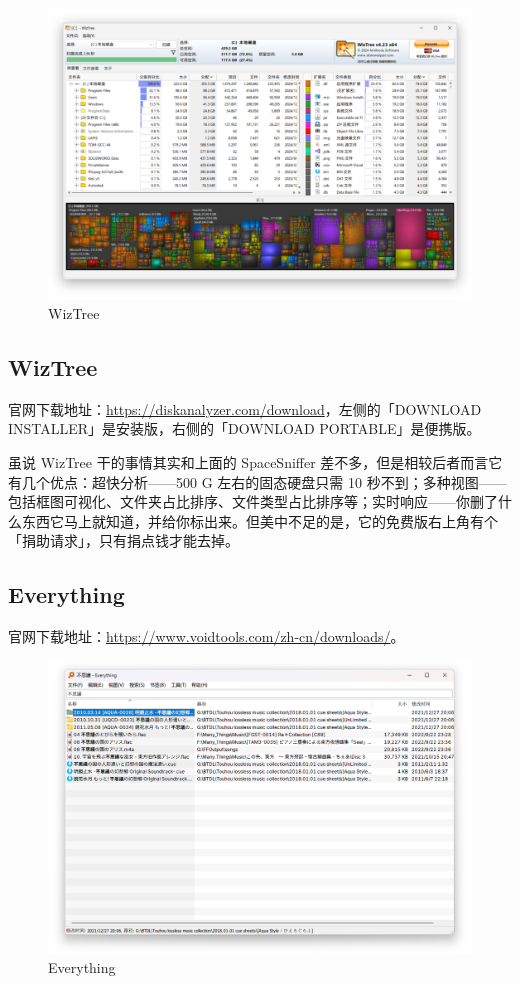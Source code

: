 \begin{figure}[htb!]
  \centering
  \includegraphics[width=.62\textwidth]{assets/software/WizTree.png}
  \caption{WizTree}
  \label{fig:WizTree}
\end{figure}

\subsection{WizTree}

官网下载地址：\url{https://diskanalyzer.com/download}，左侧的「DOWNLOAD INSTALLER」是安装版，右侧的「DOWNLOAD PORTABLE」是便携版。

虽说 WizTree 干的事情其实和上面的 SpaceSniffer 差不多，但是相较后者而言它有几个优点：超快分析——500 G 左右的固态硬盘只需 10 秒不到；多种视图——包括框图可视化、文件夹占比排序、文件类型占比排序等；实时响应——你删了什么东西它马上就知道，并给你标出来。但美中不足的是，它的免费版右上角有个「捐助请求」，只有捐点钱才能去掉。

\subsection{Everything}

官网下载地址：\url{https://www.voidtools.com/zh-cn/downloads/}。

\begin{figure}[htb!]
  \centering
  \includegraphics[width=.85\textwidth]{assets/software/Everything.png}
  \caption{Everything}
  \label{Everything}
\end{figure}

